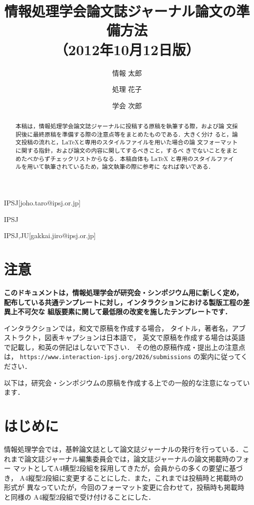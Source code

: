 \documentclass[submit,techrep]{ipsj}
\begin{document}
\title{情報処理学会論文誌ジャーナル論文の準備方法\\
（2012年10月12日版）}



\author{情報 太郎}{}{IPSJ}[joho.taro@ipsj.or.jp]
\author{処理 花子}{}{IPSJ}
\author{学会 次郎}{}{IPSJ,JU}[gakkai.jiro@ipsj.or.jp]

\begin{abstract}
本稿は，情報処理学会論文誌ジャーナルに投稿する原稿を執筆する際，および論
文採択後に最終原稿を準備する際の注意点等をまとめたものである．大きく分け
ると，論文投稿の流れと，\LaTeX と専用のスタイルファイルを用いた場合の論
文フォーマットに関する指針，および論文の内容に関してするべきこと，するべ
きでないことをまとめたべからずチェックリストからなる．本稿自体も \LaTeX 
と専用のスタイルファイルを用いて執筆されているため，論文執筆の際に参考に
なれば幸いである．
\end{abstract}

\maketitle

\section{注意}

{\bf
このドキュメントは，情報処理学会が研究会・シンポジウム用に新しく定め，
配布している共通テンプレートに対し，インタラクションにおける製版工程の差異上不可欠な
組版要素に関して最低限の改変を施したテンプレートです．

インタラクションでは，和文で原稿を作成する場合，
タイトル，著者名，アブストラクト，図表キャプションは日本語で，
英文で原稿を作成する場合は英語で記載し，和英の併記はしないで下さい．
その他の原稿作成・提出上の注意点は，
\texttt{https://www.interaction-ipsj.org/2026/submissions} の案内に従ってください．

以下は，研究会・シンポジウムの原稿を作成する上での一般的な注意になっています．
}

\section{はじめに}

情報処理学会では，基幹論文誌として論文誌ジャーナルの発行を行っている．こ
れまで論文誌ジャーナル編集委員会では，論文誌ジャーナルの論文掲載時のフォー
マットとしてA4横型2段組を採用してきたが，会員からの多くの要望に基づき，
A4縦型2段組に変更することにした．また，これまでは投稿時と掲載時の形式が
異なっていたが，今回のフォーマット変更に合わせて，投稿時も掲載時と同様の
A4縦型2段組で受け付けることにした．
\end{document}
